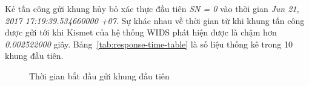 Kẻ tấn công gửi khung hủy bỏ xác thực đầu tiên \emph{SN = 0} vào thời gian \emph{Jun 21, 2017 17:19:39.534660000 +07}. Sự khác nhau về thời gian từ khi khung tấn công được gửi tới khi Kismet của hệ thống WIDS phát hiện được là chậm hơn \emph{0.002522000} giây. Bảng~\ref{tab:response-time-table} là số liệu thống kê trong 10 khung đầu tiên.

\begin{figure}[H]
    \centering
    \caption{
        \label{fig:deauth-attack-sent}
        Thời gian bắt đầu gửi khung đầu tiên}
\end{figure}

